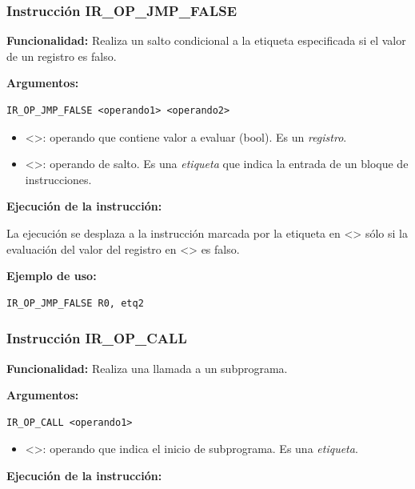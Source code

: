 \subsubsection{Instrucción IR\_OP\_JMP\_FALSE}\label{subsubsec:IR_OP_JMP_FALSE}
\noindent
\textbf{Funcionalidad:} Realiza un salto condicional a la etiqueta especificada si el valor de un registro es falso.

\noindent
\textbf{Argumentos:}
\begin{verbatim}
IR_OP_JMP_FALSE <operando1> <operando2>
\end{verbatim}
\begin{itemize}
    \item <>: operando que contiene valor a evaluar (bool). Es un \textit{registro}.
    \item <>: operando de salto. Es una \textit{etiqueta} que indica la entrada de un bloque de instrucciones.
\end{itemize}

\noindent
\textbf{Ejecución de la instrucción:}
\vspace{0.3cm}

\noindent
La ejecución se desplaza a la instrucción marcada por la etiqueta en <> sólo si la evaluación del valor del registro en <> es falso.
\vspace{0.3cm}

\noindent
\textbf{Ejemplo de uso:}
\begin{verbatim}
IR_OP_JMP_FALSE R0, etq2
\end{verbatim}

\subsubsection{Instrucción IR\_OP\_CALL}\label{subsubsec:IR_OP_CALL}
\noindent
\textbf{Funcionalidad:} Realiza una llamada a un subprograma.

\noindent
\textbf{Argumentos:}
\begin{verbatim}
IR_OP_CALL <operando1>
\end{verbatim}
\begin{itemize}
    \item <>: operando que indica el inicio de subprograma. Es una \textit{etiqueta}.
\end{itemize}

\noindent
\textbf{Ejecución de la instrucción:}
\vspace{0.3cm}

